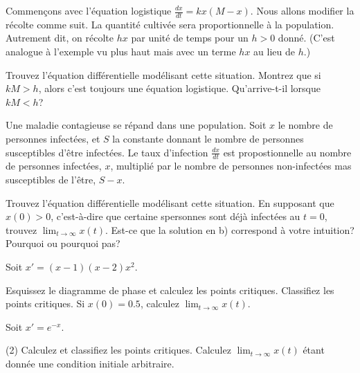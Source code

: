 \begin{exercise}
	Commençons avec l'équation logistique $\frac{dx}{dt} = kx(M-x)$.
	Nous allons modifier la récolte comme suit.  La quantité cultivée sera proportionnelle à la population.
	Autrement dit, on récolte $hx$	par unité de temps pour un  $h > 0$ donné.
	(C'est analogue à l'exemple vu plus haut mais avec un terme $hx$ au lieu de  $h$.)
	\begin{tasks}
		\task Trouvez l'équation différentielle modélisant cette situation.
		\task Montrez que si $kM > h$, alors c'est toujours une équation logistique.
		\task Qu'arrive-t-il lorsque  $kM < h$?
	\end{tasks}
\end{exercise}

\begin{exercise}
	Une maladie contagieuse se répand dans une population.
	Soit $x$ le nombre de personnes infectées, et $S$ la constante donnant le nombre de personnes susceptibles  d'être infectées.
	Le taux d'infection $\frac{dx}{dt}$ est propostionnelle au nombre de personnes infectées, $x$,
	multiplié par le nombre de personnes non-infectées mas susceptibles de l'être, $S-x$.
	\begin{tasks}
		\task Trouvez l'équation différentielle modélisant cette situation.
		\task En supposant que $x(0) > 0$, c'est-à-dire que certaine spersonnes sont déjà infectées au $t=0$,
				trouvez $\displaystyle \lim_{t\to\infty} x(t)$.
		\task Est-ce que la solution en b) correspond à votre intuition? Pourquoi ou pourquoi pas?
	\end{tasks}
\end{exercise}


\setcounter{exercise}{100}

\begin{exercise}
	Soit $x'=(x-1)(x-2)x^2$.
	\begin{tasks}
		\task Esquissez le diagramme de phase et calculez les points critiques.
		\task Classifiez les points critiques.
		\task Si $x(0)=0.5$, calculez $\displaystyle \lim_{t\to\infty} x(t)$.
	\end{tasks}
\end{exercise}

\begin{exercise}
	Soit $x'=e^{-x}$.
	\begin{tasks}(2)
		\task Calculez et classifiez les points critiques.
		\task Calculez $\displaystyle \lim_{t\to\infty} x(t)$ étant donnée une condition initiale arbitraire.
	\end{tasks}
\end{exercise}

